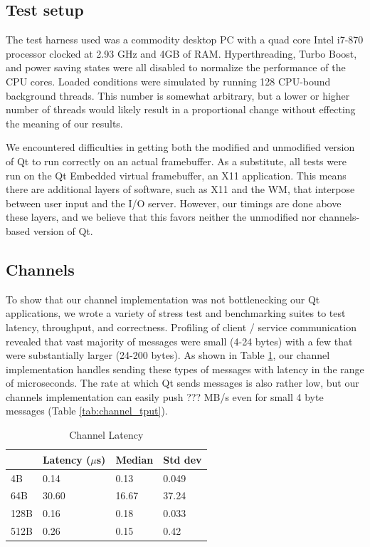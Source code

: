 \documentclass[letterpaper,twocolumn,10pt]{article}
\begin{document}
\subsection{Test setup}

The test harness used was a commodity desktop PC with a quad core Intel i7-870 processor clocked at 2.93 GHz and 4GB of RAM. Hyperthreading, Turbo Boost, and power saving states were all disabled to normalize the performance of the CPU cores. Loaded conditions were simulated by running 128 CPU-bound background threads. This number is somewhat arbitrary, but a lower or higher number of threads would likely result in a proportional change without effecting the meaning of our results.

We encountered difficulties in getting both the modified and unmodified version of Qt to run correctly on an actual framebuffer. As a substitute, all tests were run on the Qt Embedded virtual framebuffer, an X11 application. This means there are additional layers of software, such as X11 and the WM, that interpose between user input and the I/O server. However, our timings are done above these layers, and we believe that this favors neither the unmodified nor channels-based version of Qt.

\subsection{Channels}

To show that our channel implementation was not bottlenecking our Qt applications, we wrote a variety of stress test and benchmarking suites to test latency, throughput, and correctness. Profiling of client / service communication revealed that vast majority of messages were small (4-24 bytes) with a few that were substantially larger (24-200 bytes). As shown in Table \ref{tab:channel_latency}, our channel implementation handles sending these types of messages with latency in the range of microseconds. The rate at which Qt sends messages is also rather low, but our channels implementation can easily push ??? MB/s even for small 4 byte messages (Table \ref{tab:channel_tput}).

\begin{table}[tp]
\caption{Channel Latency}
\label{tab:channel_latency}
\centering
\begin{tabular}{|l | l | l | l |}
\hline
		&Latency ($\mu$s)	&Median	&Std dev\\ \hline
4B		&0.14	&0.13	&0.049\\
64B		&30.60	&16.67	&37.24\\
128B	&0.16	&0.18	&0.033\\
512B	&0.26	&0.15	&0.42\\
\hline
\end{tabular}
\end{table}
\end{document}
